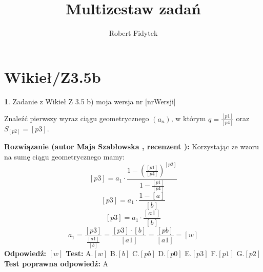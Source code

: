 \documentclass[12pt, a4paper]{article}
\title{Multizestaw zadań}
\author{Robert Fidytek}
\date{}
\theoremstyle{definition} %
\newtheorem{zad}{}
\newcommand{\kategoria}[1]{\section{#1}} %
\newcommand{\zadStart}[1]{\begin{zad}#1\newline} %
\newcommand{\zadStop}{\end{zad}}   %
\newcommand{\rozwStart}[2]{\noindent \textbf{Rozwiązanie (autor #1 , recenzent #2): }\newline} %
\newcommand{\rozwStop}{\newline}                                            %
\newcommand{\odpStart}{\noindent \textbf{Odpowiedź:}\newline}    %
\newcommand{\odpStop}{\newline}                                             %
\newcommand{\testStart}{\noindent \textbf{Test:}\newline} %
\newcommand{\testStop}{\newline} %
\newcommand{\kluczStart}{\noindent \textbf{Test poprawna odpowiedź:}\newline} %
\newcommand{\kluczStop}{\newline} %
\begin{document}
\maketitle


\kategoria{Wikieł/Z3.5b}
\zadStart{Zadanie z Wikieł Z 3.5 b)  moja wersja nr [nrWersji]}


Znaleźć pierwszy wyraz ciągu geometrycznego $(a_{n})$, w którym $q=\frac{[p1]}{[p4]}$ oraz $S_{[p2]}=[p3].$
\zadStop
\rozwStart{Maja Szabłowska}{}
Korzystając ze wzoru na sumę ciągu geometrycznego mamy:
$$ [p3]=a_{1}\cdot \frac{1-(\frac{[p1]}{[p4]})^{[p2]}}{1-\frac{[p1]}{[p4]}}$$
$$ [p3]=a_{1}\cdot \frac{1-[a]}{[b]}$$
$$ [p3]=a_{1}\cdot \frac{[a1]}{[b]}$$
$$ a_{1}=\frac{[p3]}{\frac{[a1]}{[b]}}=\frac{[p3]\cdot[b]}{[a1]}=\frac{[pb]}{[a1]}=[w]$$
\rozwStop
\odpStart
$[w]$
\odpStop
\testStart
A.$[w]$
B.$[b]$
C.$[pb]$
D.$[p0]$
E.$[p3]$
F.$[p1]$
G.$[p2]$
\testStop
\kluczStart
A
\kluczStop
\end{document}
